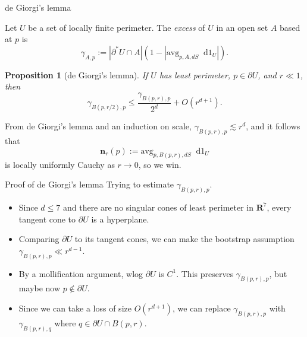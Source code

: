 \documentclass[10pt]{beamer}
\newcommand{\RR}{\mathbf{R}}
\newcommand*\dif{\mathop{}\!\mathrm{d}}
\newcommand{\dfn}[1]{\emph{#1}\index{#1}}
\newcommand{\avg}{\mathrm{avg}}
\newcommand{\normal}{\mathbf n}
\newtheorem{proposition}{Proposition}
\begin{document}
\begin{frame}{de Giorgi's lemma}
\begin{definition}
Let $U$ be a set of locally finite perimeter.
The \dfn{excess} of $U$ in an open set $A$ based at $p$ is
$$\gamma_{A, p} := |\partial^* U \cap A|\left(1 - \left|\avg_{p, A, dS} \dif 1_U\right|\right).$$
\end{definition}\pause

\begin{proposition}[de Giorgi's lemma]
If $U$ has least perimeter, $p \in \partial U$, and $r \ll 1$, then
$$\gamma_{B(p, r/2), p} \leq \frac{\gamma_{B(p, r), p}}{2^d} + O(r^{d + 1}).$$
\end{proposition}\pause

From de Giorgi's lemma and an induction on scale, $\gamma_{B(p, r), p} \lesssim r^d$, and it follows that 
$$\normal_r(p) := \avg_{p, B(p, r), dS} \dif 1_U$$
is locally uniformly Cauchy as $r \to 0$, so we win.
\end{frame}

\begin{frame}{Proof of de Giorgi's lemma}
Trying to estimate $\gamma_{B(p, r), p}$.\pause

\begin{itemize}
\item Since $d \leq 7$ and there are no singular cones of least perimeter in $\RR^7$, every tangent cone to $\partial U$ is a hyperplane.\pause
\item Comparing $\partial U$ to its tangent cones, we can make the bootstrap assumption $\gamma_{B(p, r), p} \ll r^{d - 1}$.\pause
\item By a mollification argument, wlog $\partial U$ is $C^1$. This preserves $\gamma_{B(p, r), p}$, but maybe now $p \notin \partial U$.\pause
\item Since we can take a loss of size $O(r^{d + 1})$, we can replace $\gamma_{B(p, r), p}$ with $\gamma_{B(p, r), q}$ where $q \in \partial U \cap B(p, r)$.
\end{itemize}
\end{frame}
\end{document}
